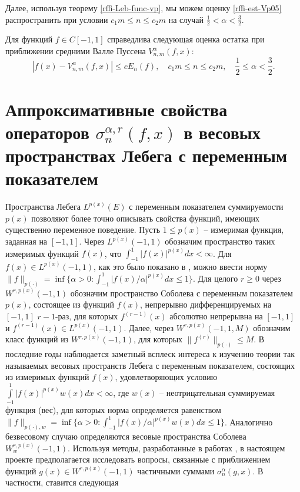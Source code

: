 Далее, используя теорему \ref{rffi-Leb-func-vp}, мы можем оценку \eqref{rffi-est-Vp05} распространить при условии $c_1 m \le n \le c_2 m$ на случай $\frac{1}{2} < \alpha < \frac{3}{2}$.
\begin{theorem}
Для функций $f \in C[-1,1]$ справедлива следующая оценка остатка при приближении средними Валле Пуссена $V_{n,m}^\alpha(f,x)$:
\begin{equation*}
|f(x)-V_{n,m}^\alpha(f,x)| \le c E_n(f),
\quad c_1 m \le n \le c_2 m, \quad \frac{1}{2} \le \alpha < \frac{3}{2}.
\end{equation*}
\end{theorem}



\chapter{Аппроксимативные свойства операторов $\sigma^{\alpha,r}_n(f,x)$ в весовых пространствах Лебега с переменным показателем}

Пространства Лебега $L^{p(x)}(E)$ с переменным показателем суммируемости $p(x)$ позволяют более точно описывать свойства функций, имеющих существенно переменное поведение. %
Пусть $1\le p(x)$ -- измеримая функция, заданная на $[-1,1]$. Через $L^{p(x)}(-1,1)$ обозначим пространство таких измеримых функций $f(x)$, что $\int_{-1}^1|f(x)|^{p(x)}dx <\infty$. Для $f(x)\in L^{p(x)}(-1,1)$, как это было показано в \cite{rffi-20}, можно  ввести норму $\|f\|_{p(\cdot)}=\inf\{\alpha>0:\int_{-1}^1|f(x)/\alpha|^{p(x)}dx\le1\}$. Для целого $r\ge0$
через $W^{r,p(x)}(-1,1)$ обозначим пространство Соболева с переменным показателем $p(x)$, состоящее из функций $f(x)$, непрерывно дифференцируемых на $[-1,1]$ $r-1$-раз, для которых $f^{(r-1)}(x)$ абсолютно непрерывна на $[-1,1]$  и $f^{(r-1)}(x)\in L^{p(x)}(-1,1)$.
Далее, через  $W^{r,p(x)}(-1,1,M)$ обозначим класс функций из $W^{r,p(x)}(-1,1)$, для которых $\|f^{(r)}\|_{p(\cdot)}\le M$.
В последние годы наблюдается заметный всплеск интереса к изучению теории так называемых весовых пространств Лебега с переменным показателем, состоящих из измеримых функций $f(x)$, удовлетворяющих условию $\int\limits_{-1}^{1} |f(x)|^{p(x)} w(x) dx < \infty$, где $w(x)$ -- неотрицательная суммируемая функция (вес), для которых норма определяется равенством $\|f\|_{p(\cdot),w}=\inf\{\alpha>0:\int_{-1}^1|f(x)/\alpha|^{p(x)}w(x)dx\le1\}$. Аналогично безвесовому случаю определяются весовые пространства Соболева $W^{r,p(x)}_w(-1,1)$. Используя методы, разработанные в работах \cite{rffi-26, rffi-27, rffi-28, rffi-29, rffi-30, rffi-31, rffi-32}, в настоящем проекте предполагается исследовать вопросы, связанные с приближением функций $g(x)\in W^{r,p(x)}(-1,1)$ частичными суммами $\sigma_n^\alpha(g,x)$. В частности, ставится следующая

